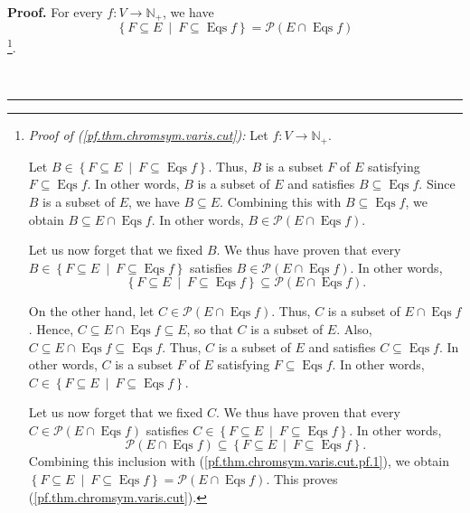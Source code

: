 \documentclass[numbers=enddot,12pt,final,onecolumn,notitlepage]{scrartcl}%
\theoremstyle{definition}
\newenvironment{proof}[1][Proof]{\noindent\textbf{#1.} }{\ \rule{0.5em}{0.5em}}
\newenvironment{verlong}{}{}
\begin{document}
\begin{verlong}
\begin{proof}
For every $f:V\rightarrow\mathbb{N}_{+}$, we have%
\begin{equation}
\left\{  F\subseteq E\ \mid\ F\subseteq\operatorname*{Eqs}f\right\}
=\mathcal{P}\left(  E\cap\operatorname*{Eqs}f\right)
\label{pf.thm.chromsym.varis.cut}%
\end{equation}
\footnote{\textit{Proof of (\ref{pf.thm.chromsym.varis.cut}):} Let
$f:V\rightarrow\mathbb{N}_{+}$.
\par
Let $B\in\left\{  F\subseteq E\ \mid\ F\subseteq\operatorname*{Eqs}f\right\}
$. Thus, $B$ is a subset $F$ of $E$ satisfying $F\subseteq\operatorname*{Eqs}%
f$. In other words, $B$ is a subset of $E$ and satisfies $B\subseteq
\operatorname*{Eqs}f$. Since $B$ is a subset of $E$, we have $B\subseteq E$.
Combining this with $B\subseteq\operatorname*{Eqs}f$, we obtain $B\subseteq
E\cap\operatorname*{Eqs}f$. In other words, $B\in\mathcal{P}\left(
E\cap\operatorname*{Eqs}f\right)  $.
\par
Let us now forget that we fixed $B$. We thus have proven that every
$B\in\left\{  F\subseteq E\ \mid\ F\subseteq\operatorname*{Eqs}f\right\}  $
satisfies $B\in\mathcal{P}\left(  E\cap\operatorname*{Eqs}f\right)  $. In
other words,%
\begin{equation}
\left\{  F\subseteq E\ \mid\ F\subseteq\operatorname*{Eqs}f\right\}
\subseteq\mathcal{P}\left(  E\cap\operatorname*{Eqs}f\right)  .
\label{pf.thm.chromsym.varis.cut.pf.1}%
\end{equation}
\par
On the other hand, let $C\in\mathcal{P}\left(  E\cap\operatorname*{Eqs}%
f\right)  $. Thus, $C$ is a subset of $E\cap\operatorname*{Eqs}f$. Hence,
$C\subseteq E\cap\operatorname*{Eqs}f\subseteq E$, so that $C$ is a subset of
$E$. Also, $C\subseteq E\cap\operatorname*{Eqs}f\subseteq\operatorname*{Eqs}%
f$. Thus, $C$ is a subset of $E$ and satisfies $C\subseteq\operatorname*{Eqs}%
f$. In other words, $C$ is a subset $F$ of $E$ satisfying $F\subseteq
\operatorname*{Eqs}f$. In other words, $C\in\left\{  F\subseteq E\ \mid
\ F\subseteq\operatorname*{Eqs}f\right\}  $.
\par
Let us now forget that we fixed $C$. We thus have proven that every
$C\in\mathcal{P}\left(  E\cap\operatorname*{Eqs}f\right)  $ satisfies
$C\in\left\{  F\subseteq E\ \mid\ F\subseteq\operatorname*{Eqs}f\right\}  $.
In other words,%
\[
\mathcal{P}\left(  E\cap\operatorname*{Eqs}f\right)  \subseteq\left\{
F\subseteq E\ \mid\ F\subseteq\operatorname*{Eqs}f\right\}  .
\]
Combining this inclusion with (\ref{pf.thm.chromsym.varis.cut.pf.1}), we
obtain $\left\{  F\subseteq E\ \mid\ F\subseteq\operatorname*{Eqs}f\right\}
=\mathcal{P}\left(  E\cap\operatorname*{Eqs}f\right)  $. This proves
(\ref{pf.thm.chromsym.varis.cut}).}.


\end{proof}
\end{verlong}
\end{document}
